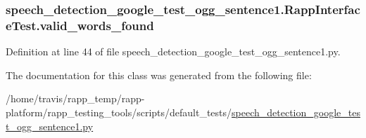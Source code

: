 \hypertarget{classspeech__detection__google__test__ogg__sentence1_1_1RappInterfaceTest_a80cf34ee5ca87e0a682797fad92089a7}{
\subsubsection[{valid\-\_\-words\-\_\-found}]{\setlength{\rightskip}{0pt plus 5cm}speech\-\_\-detection\-\_\-google\-\_\-test\-\_\-ogg\-\_\-sentence1.\-Rapp\-Interface\-Test.\-valid\-\_\-words\-\_\-found}}\label{classspeech__detection__google__test__ogg__sentence1_1_1RappInterfaceTest_a80cf34ee5ca87e0a682797fad92089a7}


Definition at line 44 of file speech\-\_\-detection\-\_\-google\-\_\-test\-\_\-ogg\-\_\-sentence1.\-py.



The documentation for this class was generated from the following file\-:\begin{DoxyCompactItemize}
\item 
/home/travis/rapp\-\_\-temp/rapp-\/platform/rapp\-\_\-testing\-\_\-tools/scripts/default\-\_\-tests/\hyperlink{speech__detection__google__test__ogg__sentence1_8py}{speech\-\_\-detection\-\_\-google\-\_\-test\-\_\-ogg\-\_\-sentence1.\-py}\end{DoxyCompactItemize}
